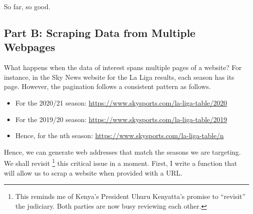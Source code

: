 \documentclass[]{tufte-handout}
\providecommand{\tightlist}{%
  \setlength{\itemsep}{0pt}\setlength{\parskip}{0pt}}
\begin{document}
So far, so good.

\hypertarget{part-b-scraping-data-from-multiple-webpages}{%
\subsection{\texorpdfstring{\textbf{Part B: Scraping Data from Multiple
Webpages}}{Part B: Scraping Data from Multiple Webpages}}\label{part-b-scraping-data-from-multiple-webpages}}

What happens when the data of interest spans multiple pages of a
website? For instance, in the Sky News website for the La Liga results,
each season has its page. However, the pagination follows a consistent
pattern as follows.

\begin{itemize}
\tightlist
\item
  For the 2020/21 season:
  \url{https://www.skysports.com/la-liga-table/2020}
\item
  For the 2019/20 season:
  \url{https://www.skysports.com/la-liga-table/2019}
\item
  Hence, for the nth season:
  \url{https://www.skysports.com/la-liga-table/n}
\end{itemize}

Hence, we can generate web addresses that match the seasons we are
targeting. We shall revisit \footnote{This reminds me of Kenya's
  President Uhuru Kenyatta's promise to ``revisit'' the judiciary. Both
  parties are now busy reviewing each other.} this critical issue in a
moment. First, I write a function that will allow us to scrap a website
when provided with a URL.
\end{document}
